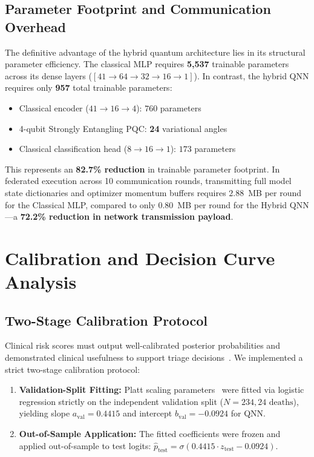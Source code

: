 \documentclass[conference]{IEEEtran}
\begin{document}
\subsection{Parameter Footprint and Communication Overhead}
The definitive advantage of the hybrid quantum architecture lies in its structural parameter efficiency. The classical MLP requires \textbf{5,537} trainable parameters across its dense layers ($[41 \to 64 \to 32 \to 16 \to 1]$). In contrast, the hybrid QNN requires only \textbf{957} total trainable parameters:
\begin{itemize}
    \item Classical encoder ($41 \to 16 \to 4$): $760$ parameters
    \item 4-qubit Strongly Entangling PQC: \textbf{24} variational angles
    \item Classical classification head ($8 \to 16 \to 1$): $173$ parameters
\end{itemize}

This represents an \textbf{82.7\% reduction} in trainable parameter footprint. In federated execution across 10 communication rounds, transmitting full model state dictionaries and optimizer momentum buffers requires $2.88$~MB per round for the Classical MLP, compared to only $0.80$~MB per round for the Hybrid QNN---a \textbf{72.2\% reduction in network transmission payload}.

\section{Calibration and Decision Curve Analysis}
\subsection{Two-Stage Calibration Protocol}
Clinical risk scores must output well-calibrated posterior probabilities and demonstrated clinical usefulness to support triage decisions~\cite{steyerberg2010assessing,vancalster2016calibration}. We implemented a strict two-stage calibration protocol:
\begin{enumerate}
    \item \textbf{Validation-Split Fitting:} Platt scaling parameters~\cite{platt1999probabilistic} were fitted via logistic regression strictly on the independent validation split ($N=234, 24\text{ deaths}$), yielding slope $a_{\text{val}} = \mathbf{0.4415}$ and intercept $b_{\text{val}} = \mathbf{-0.0924}$ for QNN.
    \item \textbf{Out-of-Sample Application:} The fitted coefficients were frozen and applied out-of-sample to test logits: $\hat{p}_{\text{test}} = \sigma(0.4415 \cdot z_{\text{test}} - 0.0924)$.
\end{enumerate}
\end{document}
